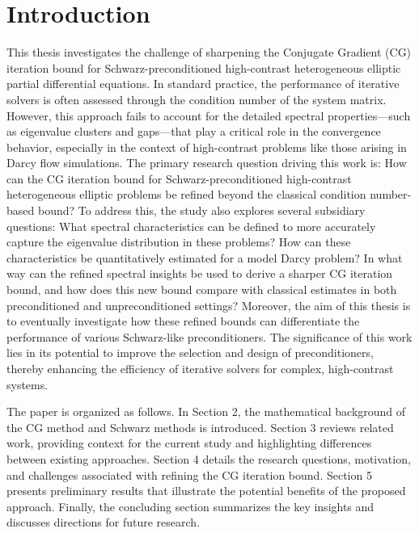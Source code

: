\chapter{Introduction}\label{ch:introduction}\newpage
This thesis investigates the challenge of sharpening the Conjugate Gradient (CG) iteration bound for Schwarz-preconditioned high-contrast heterogeneous elliptic partial differential equations. In standard practice, the performance of iterative solvers is often assessed through the condition number of the system matrix. However, this approach fails to account for the detailed spectral properties—such as eigenvalue clusters and gaps—that play a critical role in the convergence behavior, especially in the context of high-contrast problems like those arising in Darcy flow simulations. The primary research question driving this work is: How can the CG iteration bound for Schwarz-preconditioned high-contrast heterogeneous elliptic problems be refined beyond the classical condition number-based bound? To address this, the study also explores several subsidiary questions: What spectral characteristics can be defined to more accurately capture the eigenvalue distribution in these problems? How can these characteristics be quantitatively estimated for a model Darcy problem? In what way can the refined spectral insights be used to derive a sharper CG iteration bound, and how does this new bound compare with classical estimates in both preconditioned and unpreconditioned settings? Moreover, the aim of this thesis is to eventually investigate how these refined bounds can differentiate the performance of various Schwarz-like preconditioners. The significance of this work lies in its potential to improve the selection and design of preconditioners, thereby enhancing the efficiency of iterative solvers for complex, high-contrast systems.

The paper is organized as follows. In Section 2, the mathematical background of the CG method and Schwarz methods is introduced. Section 3 reviews related work, providing context for the current study and highlighting differences between existing approaches. Section 4 details the research questions, motivation, and challenges associated with refining the CG iteration bound. Section 5 presents preliminary results that illustrate the potential benefits of the proposed approach. Finally, the concluding section summarizes the key insights and discusses directions for future research.